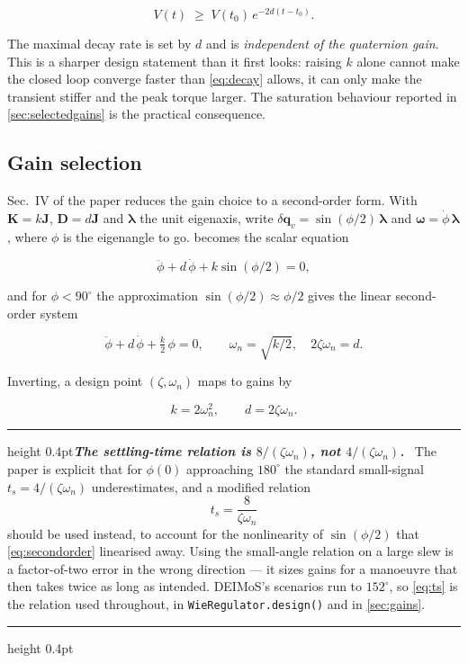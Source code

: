 \documentclass[conference,10pt,a4paper]{IEEEtran}
\newcommand{\remarkrule}{\par\nobreak\vspace{2pt}%
  \hrule height 0.4pt\vspace{4pt}\nobreak}
\newenvironment{designbox}[1][Design decision]
  {\par\medskip\remarkrule\noindent\small\textbf{\textit{#1.}}\ \ignorespaces}
  {\par\vspace{3pt}\hrule height 0.4pt\par\medskip\ignorespacesafterend}
\newenvironment{eqbox}{\ignorespaces}{\ignorespacesafterend}
\newcommand{\vect}[1]{\bm{#1}}
\newcommand{\mat}[1]{\bm{#1}}
\begin{document}
\begin{equation}
V(t) \;\ge\; V(t_0)\,e^{-2d(t-t_0)} .
\label{eq:decay}
\end{equation}

The maximal decay rate is set by $d$ and is \emph{independent of the quaternion
gain}. This is a sharper design statement than it first looks: raising $k$
alone cannot make the closed loop converge faster than \cref{eq:decay} allows,
it can only make the transient stiffer and the peak torque larger. The
saturation behaviour reported in \cref{sec:selectedgains} is the practical
consequence.

\subsection{Gain selection}
\label{sec:wiegains}

Sec.~IV of the paper reduces the gain choice to a second-order form. With
$\mat{K}=k\mat{J}$, $\mat{D}=d\mat{J}$ and $\vect{\lambda}$ the unit eigenaxis,
write $\delta\vect{q}_v=\sin(\phi/2)\,\vect{\lambda}$ and
$\vect{\omega}=\dot{\phi}\,\vect{\lambda}$, where $\phi$ is the eigenangle to
go.  becomes the scalar equation

\begin{equation}
\ddot{\phi} + d\,\dot{\phi} + k\sin(\phi/2) = 0 ,
\label{eq:phi}
\end{equation}

and for $\phi<90^\circ$ the approximation $\sin(\phi/2)\approx\phi/2$ gives the
linear second-order system

\begin{equation}
\ddot{\phi} + d\,\dot{\phi} + \tfrac{k}{2}\,\phi = 0,
\qquad
\omega_n=\sqrt{k/2},
\quad
2\zeta\omega_n = d .
\label{eq:secondorder}
\end{equation}

Inverting, a design point $(\zeta,\omega_n)$ maps to gains by

\begin{eqbox}
\begin{equation}
k = 2\omega_n^2,
\qquad
d = 2\zeta\omega_n .
\label{eq:kdrule}
\end{equation}
\end{eqbox}

\begin{designbox}[The settling-time relation is $8/(\zeta\omega_n)$, not $4/(\zeta\omega_n)$]
The paper is explicit that for $\phi(0)$ approaching $180^\circ$ the standard
small-signal $t_s=4/(\zeta\omega_n)$ underestimates, and a modified relation
\begin{equation}
t_s = \frac{8}{\zeta\omega_n}
\label{eq:ts}
\end{equation}
should be used instead, to account for the nonlinearity of $\sin(\phi/2)$ that
\cref{eq:secondorder} linearised away. Using the small-angle relation on a
large slew is a factor-of-two error in the wrong direction --- it sizes gains
for a manoeuvre that then takes twice as long as intended. DEIMoS's scenarios
run to $152^\circ$, so \cref{eq:ts} is the relation used throughout, in
\texttt{WieRegulator.design()} and in \cref{sec:gains}.
\end{designbox}
\end{document}
